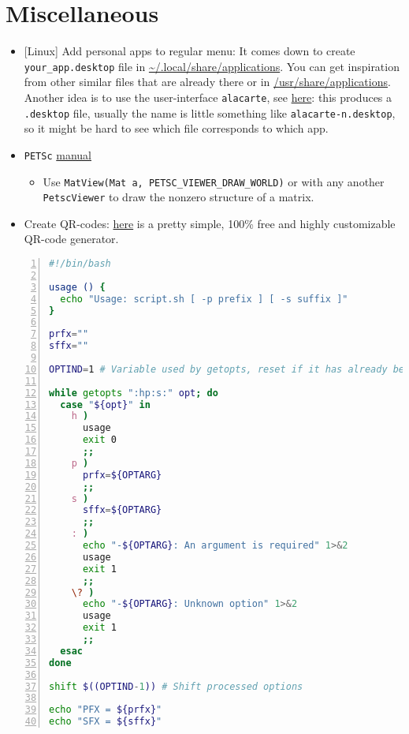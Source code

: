 \documentclass[a4paper,12pt,%
              final%
              ]{article}
\begin{document}
\section{Miscellaneous}
\label{sec:misc}
\begin{itemize}
  \item{} [Linux] Add personal apps to regular menu: It comes down to create \texttt{your\_app.desktop} file in \url{~/.local/share/applications}. You can get inspiration from other similar files that are already there or in \url{/usr/share/applications}. Another idea is to use the user-interface \texttt{alacarte}, see \href{https://askubuntu.com/questions/79583/adding-custom-applications-to-gnome-3-launcher}{here}: this produces a \texttt{.desktop} file, usually the name is little something like \texttt{alacarte-n.desktop}, so it might be hard to see which file corresponds to which app.
  \item \texttt{PETSc} \href{https://www.mcs.anl.gov/petsc/petsc-current/docs/manual.pdf}{manual}
    \begin{itemize}
      \item Use \verb|MatView(Mat a, PETSC_VIEWER_DRAW_WORLD)| or with any another \texttt{PetscViewer} to draw the nonzero structure of a matrix.
    \end{itemize}
  \item Create QR-codes: \href{https://www.qrcode-monkey.com/}{here} is a pretty simple, 100\% free and highly customizable QR-code generator.
\end{itemize}

\appendix
\begin{lstlisting}[language=bash,numbers=left,float,frame=single,caption={script.sh, an example for \texttt{getopts}},label={lst:getopt_ex},numberfirstline=true,stepnumber=5,firstnumber=1]
#!/bin/bash

usage () {
  echo "Usage: script.sh [ -p prefix ] [ -s suffix ]"
}

prfx=""
sffx=""

OPTIND=1 # Variable used by getopts, reset if it has already been used

while getopts ":hp:s:" opt; do
  case "${opt}" in
    h )
      usage
      exit 0
      ;;
    p )
      prfx=${OPTARG}
      ;;
    s )
      sffx=${OPTARG}
      ;;
    : )
      echo "-${OPTARG}: An argument is required" 1>&2
      usage
      exit 1
      ;;
    \? )
      echo "-${OPTARG}: Unknown option" 1>&2
      usage
      exit 1
      ;;
  esac
done

shift $((OPTIND-1)) # Shift processed options

echo "PFX = ${prfx}"
echo "SFX = ${sffx}"
\end{lstlisting}
\end{document}
